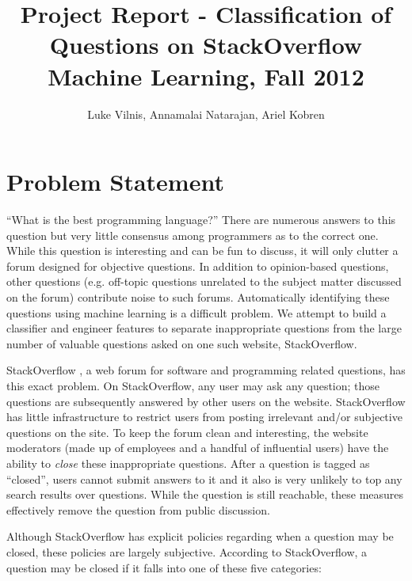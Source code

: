 \documentclass[11pt]{article}
\title{Project Report - Classification of Questions on StackOverflow\\ Machine Learning, Fall 2012}
\author{Luke Vilnis, Annamalai Natarajan, Ariel Kobren}
\begin{document}
\sloppy

\maketitle

\section{Problem Statement}

``What is the best programming language?'' There are numerous answers
to this question but very little consensus among programmers as to the
correct one. While this question is interesting and can be fun to
discuss, it will only clutter a forum designed for objective questions.
In addition to opinion-based questions, other questions (e.g. off-topic questions unrelated to the
subject matter discussed on the forum) contribute noise to such forums. Automatically identifying these questions using machine learning is a difficult problem. We attempt to build a classifier and engineer features to separate inappropriate questions from the large number of valuable questions asked on one such website, StackOverflow.

 StackOverflow \cite{website:stackoverflow}, a web forum
for software and programming related questions,
has this exact problem. On StackOverflow, any user may ask any
question; those questions are subsequently answered by other users on
the website. StackOverflow has little infrastructure to restrict users
from posting irrelevant and/or subjective questions on the site. To
keep the forum clean and interesting, the website moderators (made up of employees and a
handful of influential users) have the ability to \emph{close} these
inappropriate questions. After a question is tagged as ``closed'', users cannot submit answers to it and it also is very unlikely to top any search results over questions. While the question
is still reachable, these measures effectively remove the question
from public discussion.

 Although StackOverflow has explicit policies regarding when
a question may be closed, these policies are largely
subjective. According to StackOverflow, a question may be closed if it
falls into one of these five categories:
\end{document}
